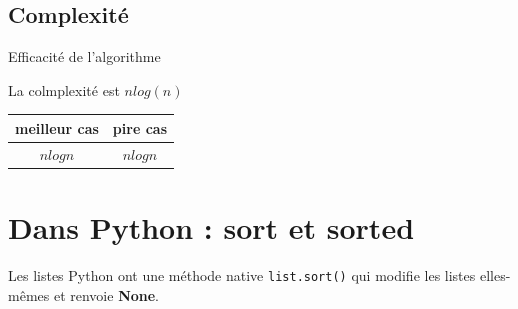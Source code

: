 \begin{exemple2}


\begin{center}
		
\end{center}


\end{exemple2}

%
%
\subsection{Complexité}
%
%
%
%
%
\begin{prop}{Efficacité de l'algorithme}

La colmplexité est \textbf{$nlog(n)$}

\begin{center}
\begin{tabular}{|c|c|}
\hline 
 meilleur cas &  pire cas \\ 
\hline 
$n log n$ & $n log n$ \\ 
\hline 
\end{tabular} 
\end{center}

\end{prop}



\section{Dans Python : sort et sorted}
Les listes Python ont une méthode native \texttt{list.sort()} qui modifie les listes elles-mêmes et renvoie \textbf{None}.

